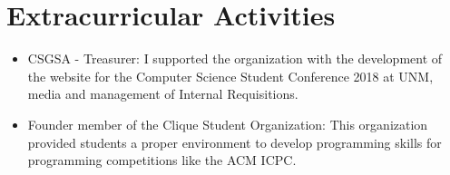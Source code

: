 \section{Extracurricular Activities}

\begin{itemize}
\item CSGSA - Treasurer: I supported the organization with the development
  of the website for the Computer Science Student Conference 2018 at UNM, media
  and management of Internal Requisitions.
\item Founder member of the Clique Student Organization: This organization
  provided students a proper environment to develop programming skills for
  programming competitions like the ACM ICPC.
\end{itemize}


